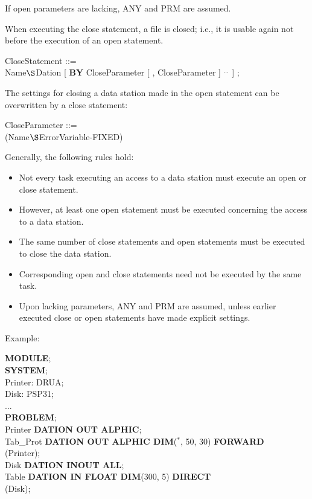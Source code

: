 If open parameters are lacking, ANY and PRM are assumed.

When executing the close statement, a file is closed; i.e., it is
usable again not before the execution of an open statement.

CloseStatement ::=\\
 Name$\S $Dation [ {\bf BY} CloseParameter [ , CloseParameter ] $^{...}$ ] ;

The settings for closing a data station made in the open statement can
be overwritten by a close statement:

CloseParameter ::=\\
 (Name$\S $ErrorVariable-FIXED)

Generally, the following rules hold:
\begin{itemize}
\item Not every task executing an access to a data station must execute
an open or close statement.
\item However, at least one open statement must be executed concerning
the access to a data station.
\item The same number of close statements and open statements must
be executed to close the data station.
\item Corresponding open and close statements need not be executed by
the same task.
\item Upon lacking parameters, ANY and PRM are assumed, unless earlier
executed close or open statements have made explicit settings.
\end{itemize}

Example:

{\bf MODULE};\\
{\bf SYSTEM};\\
\x Printer: DRUA;\\
\x Disk: PSP31;\\
\x ... \\
{\bf PROBLEM};\\
 Printer {\bf DATION OUT  ALPHIC};\\
 Tab\_Prot {\bf DATION OUT ALPHIC DIM}($^*$, 50, 30) {\bf FORWARD}\\
\x {}(Printer);\\
 Disk {\bf DATION INOUT  ALL};\\
 Table {\bf DATION IN FLOAT DIM}(300, 5) {\bf DIRECT}\\
\x {}(Disk);

